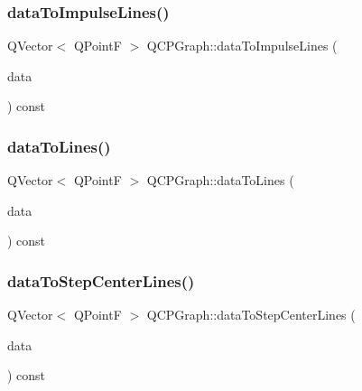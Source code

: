 \subsubsection{\texorpdfstring{data\+To\+Impulse\+Lines()}{dataToImpulseLines()}}
{\footnotesize\ttfamily Q\+Vector$<$ Q\+PointF $>$ Q\+C\+P\+Graph\+::data\+To\+Impulse\+Lines (\begin{DoxyParamCaption}\item[{const Q\+Vector$<$ \hyperlink{class_q_c_p_graph_data}{Q\+C\+P\+Graph\+Data} $>$ \&}]{data }\end{DoxyParamCaption}) const\hspace{0.3cm}{\ttfamily [protected]}}

\mbox{\label{class_q_c_p_graph_a0085ee728fdd72a827c1e6ced4476363}} 
\subsubsection{\texorpdfstring{data\+To\+Lines()}{dataToLines()}}
{\footnotesize\ttfamily Q\+Vector$<$ Q\+PointF $>$ Q\+C\+P\+Graph\+::data\+To\+Lines (\begin{DoxyParamCaption}\item[{const Q\+Vector$<$ \hyperlink{class_q_c_p_graph_data}{Q\+C\+P\+Graph\+Data} $>$ \&}]{data }\end{DoxyParamCaption}) const\hspace{0.3cm}{\ttfamily [protected]}}

\mbox{\label{class_q_c_p_graph_a238116f1898c49cb8209d61707b5b367}} 
\subsubsection{\texorpdfstring{data\+To\+Step\+Center\+Lines()}{dataToStepCenterLines()}}
{\footnotesize\ttfamily Q\+Vector$<$ Q\+PointF $>$ Q\+C\+P\+Graph\+::data\+To\+Step\+Center\+Lines (\begin{DoxyParamCaption}\item[{const Q\+Vector$<$ \hyperlink{class_q_c_p_graph_data}{Q\+C\+P\+Graph\+Data} $>$ \&}]{data }\end{DoxyParamCaption}) const\hspace{0.3cm}{\ttfamily [protected]}}

